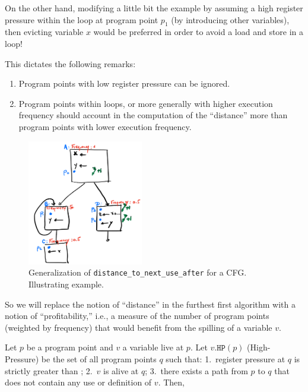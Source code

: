 {On the other hand, modifying a little bit the example by assuming a high register pressure within the loop at program point $p_1$ (by introducing other variables), then evicting variable $x$ would be preferred in order to avoid a load and store in a loop!



This dictates the following remarks:
\begin{enumerate}
  \item Program points with low register pressure can be ignored.
  \item Program points within loops, or more generally with higher execution frequency should account in the computation of the ``distance'' more than program points with lower execution frequency.
\end{enumerate}

\begin{figure}
  \includegraphics[width=0.45\textwidth]{figures/priority-spill-CFG.pdf}

  \caption{Generalization of \texttt{distance\_to\_next\_use\_after} for a CFG. Illustrating example.}
  \label{fig:ra:priority-spill-CFG}
\end{figure}

So we will replace the notion of ``distance'' in the furthest first algorithm with a notion of ``profitability,'' i.e., a measure of the number of program points (weighted by frequency) that would benefit from the spilling of a variable $v$.

%
%

\begin{definition}
%
  Let $p$ be a program point and $v$ a variable live at $p$.
  Let $v.\texttt{HP}(p)$ (High-Pressure) be the set of all program points $q$ such that:
  1.~register pressure at $q$ is strictly greater than \regs;
  2.~$v$ is alive at $q$;
  3.~there exists a path from $p$ to $q$ that does not contain any use or definition of $v$.
  Then,


\end{definition}}
